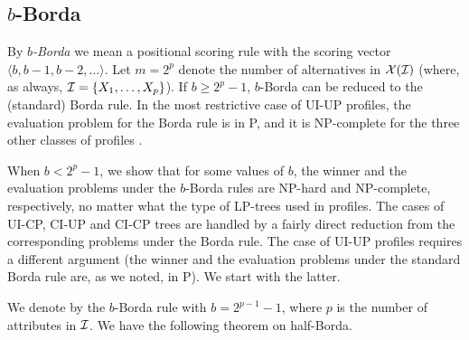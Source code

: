 \subsection{$b$-Borda}
By \emph{$b$-Borda} we mean a positional scoring rule with the scoring 
vector $\langle b,b-1,b-2,\ldots\rangle$. Let $m=2^p$ denote the number 
of alternatives in $\mathcal{X}(\mathcal{I})$ (where, as always, $\mathcal{I} =\{X_1,\ldots, 
X_p\}$). If $b \geq 2^p-1$, $b$-Borda can be reduced to the (standard) 
Borda rule. 
In the most restrictive case of UI-UP profiles, the evaluation problem 
for the Borda rule is in P, and it is NP-complete for the three other 
classes of profiles \cite{lang:aggLP}. 

When $b < 2^p-1$, we show that for some values
of $b$, the winner and the evaluation problems under the 
$b$-Borda rules are NP-hard and NP-complete, respectively, no matter
what the type of LP-trees used in profiles. The cases of UI-CP, CI-UP
and CI-CP trees are handled by a fairly direct reduction from the 
corresponding problems under the Borda rule. The case of UI-UP profiles
requires a different argument (the winner and the evaluation problems 
under the standard Borda rule are, as we noted, in P). 
We start with the latter. 

We denote by  the $b$-Borda rule with $b=2^{p-1}-1$,
where $p$ is the number of attributes in $\mathcal{I}$.
We have the following theorem on half-Borda.

